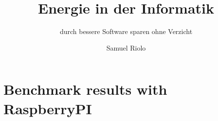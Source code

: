 \documentclass{../template/ffhsthesis}
\begin{document}


\title{Energie in der Informatik}
\subtitle{ durch bessere Software sparen ohne Verzicht} %
\author{Samuel Riolo}


\maketitle





\startThesis
\chapter{Benchmark results with RaspberryPI}
\end{document}
